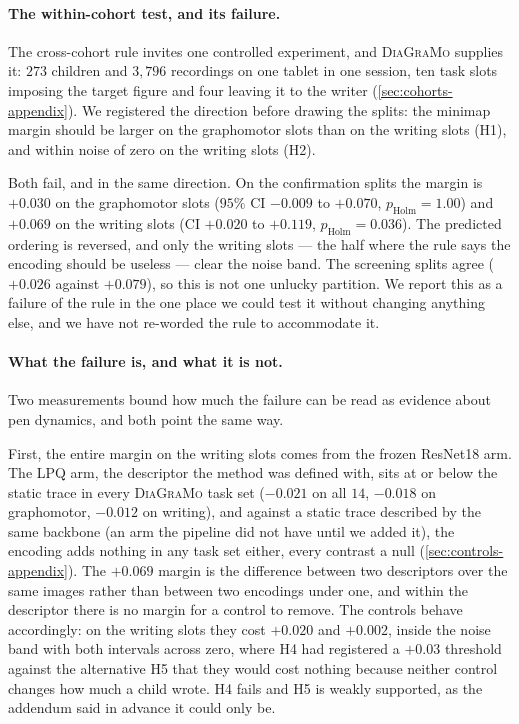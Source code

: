 \documentclass{article}
\begin{document}


\paragraph{The within-cohort test, and its failure.} The cross-cohort rule invites one controlled
experiment, and \textsc{DiaGraMo} supplies it: $273$ children and $3{,}796$ recordings on one
tablet in one session, ten task slots imposing the target figure and four leaving it to the writer
(\cref{sec:cohorts-appendix}). We registered the direction before drawing
the splits: the minimap margin should be larger on the graphomotor slots than on the writing slots
(H1), and within noise of zero on the writing slots (H2).

Both fail, and in the same direction. On the confirmation splits the margin is $+0.030$ on the
graphomotor slots ($95\%$ CI $-0.009$ to $+0.070$, $p_{\text{Holm}} = 1.00$) and $+0.069$ on the
writing slots (CI $+0.020$ to $+0.119$, $p_{\text{Holm}} = 0.036$). The predicted ordering is
reversed, and only the writing slots --- the half where the rule says the encoding should be
useless --- clear the noise band. The screening splits agree ($+0.026$ against $+0.079$), so this is
not one unlucky partition. We report this as a failure of the rule in the one place we could test
it without changing anything else, and we have not re-worded the rule to accommodate it.

\paragraph{What the failure is, and what it is not.} Two measurements bound how much the failure
can be read as evidence about pen dynamics, and both point the same way.

First, the entire margin on the writing slots comes from the frozen ResNet18 arm. The LPQ arm, the
descriptor the method was defined with, sits at or below the static trace in every
\textsc{DiaGraMo} task set ($-0.021$ on all $14$, $-0.018$ on graphomotor, $-0.012$ on writing), and
against a static trace described by the same backbone (an arm the pipeline did not have until we
added it), the encoding adds nothing in any task set either, every contrast a null
(\cref{sec:controls-appendix}). The $+0.069$ margin is the difference between two descriptors over
the same images rather than between two encodings under one, and within the descriptor there is no
margin for a control to remove. The controls behave accordingly: on the writing slots they cost
$+0.020$ and $+0.002$, inside the noise band with both intervals across zero, where H4 had
registered a $+0.03$ threshold against the alternative H5 that they would cost nothing because
neither control changes how much a child wrote. H4 fails and H5 is weakly supported, as the addendum
said in advance it could only be.
\end{document}
